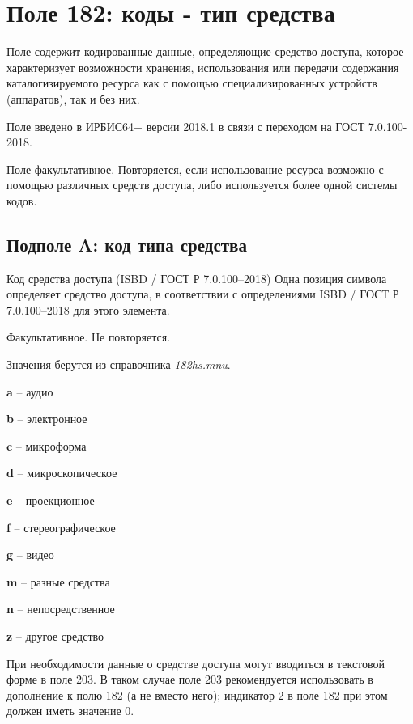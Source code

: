 \chapter{Поле 182: коды - тип средства}

Поле содержит кодированные данные, определяющие средство доступа, которое характеризует возможности хранения, использования или передачи содержания каталогизируемого ресурса как с помощью специализированных устройств (аппаратов), так и без них.

Поле введено в ИРБИС64+ версии 2018.1 в связи с переходом на ГОСТ 7.0.100-2018.

Поле факультативное. Повторяется, если использование ресурса возможно с помощью различных средств доступа, либо используется более одной системы кодов.

\section{Подполе A: код типа средства}

Код средства доступа (ISBD / ГОСТ Р 7.0.100–2018)
Одна позиция символа определяет средство доступа, в соответствии с определениями ISBD / ГОСТ Р 7.0.100–2018 для этого элемента.

Факультативное. Не повторяется.

Значения берутся из справочника \emph{182hs.mnu}.

\begin{cutelist}
    \item \textbf{a} -- аудио
    \item \textbf{b} -- электронное
    \item \textbf{c} -- микроформа
    \item \textbf{d} -- микроскопическое
    \item \textbf{e} -- проекционное
    \item \textbf{f} -- стереографическое
    \item \textbf{g} -- видео
    \item \textbf{m} -- разные средства
    \item \textbf{n} -- непосредственное
    \item \textbf{z} -- другое средство
\end{cutelist}

При необходимости данные о средстве доступа могут вводиться в текстовой форме в поле 203. В таком случае поле 203 рекомендуется использовать в дополнение к полю 182 (а не вместо него); индикатор 2 в поле 182 при этом должен иметь значение 0.

